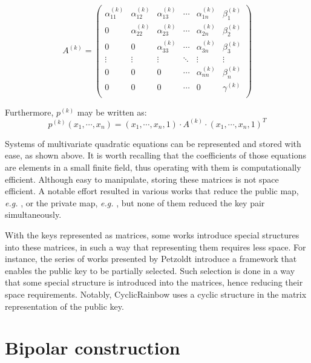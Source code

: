 \documentclass{ufsctex/ufsctex}
\begin{document}
\begin{equation}
A^{(k)} =
\begin{pmatrix}
\alpha^{(k)}_{11} & \alpha^{(k)}_{12} & \alpha^{(k)}_{13} & \cdots &
	\alpha^{(k)}_{1n} & \beta^{(k)}_1 \\
0 & \alpha^{(k)}_{22} & \alpha^{(k)}_{23} & \cdots &
	\alpha^{(k)}_{2n} & \beta^{(k)}_2 \\
0 & 0 & \alpha^{(k)}_{33} & \cdots &
	\alpha^{(k)}_{3n} & \beta^{(k)}_3 \\
\vdots & \vdots & \vdots & \ddots & \vdots & \vdots \\
0 & 0 & 0 & \cdots & \alpha^{(k)}_{nn} & \beta^{(k)}_n \\
0 & 0 & 0 & \cdots & 0 & \gamma^{(k)} \\
\end{pmatrix}
\end{equation}

Furthermore, $p^{(k)}$ may be written as:
\begin{equation}
p^{(k)}(x_1,\cdots,x_n) =
	(x_1,\cdots,x_n,1) \cdot A^{(k)} \cdot (x_1,\cdots,x_n,1)^T
\end{equation}

Systems of multivariate quadratic equations can be represented and stored with
ease, as shown above. It is worth recalling that the coefficients of those
equations are elements in a small finite field, thus operating with them is
computationally efficient. Although easy to manipulate, storing these matrices
is not space efficient. A notable effort resulted in various works that reduce
the public map, \textit{e.g.} \cite{petzoldt2010cyclicrainbow}, or the private
map, \textit{e.g.} \cite{yasuda2012reducing}, but none of them reduced the key
pair simultaneously.

With the keys represented as matrices, some works introduce special structures
into these matrices, in such a way that representing them requires less space.
For instance, the series of works presented by Petzoldt introduce a framework
that enables the public key to be partially selected. Such selection is done in
a way that some special structure is introduced into the matrices, hence
reducing their space requirements. Notably, CyclicRainbow uses a cyclic
structure in the matrix representation of the public key.

\section{Bipolar construction}\label{sec:bipolar}
\end{document}
